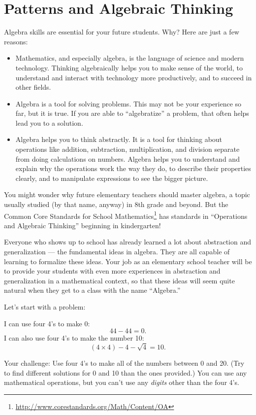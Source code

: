 
\chapter{Patterns and Algebraic Thinking}


Algebra skills are essential for your future students.  Why?  Here are just a few reasons:
\begin{itemize}
\item
Mathematics, and especially algebra, is the language of  science and modern technology.  Thinking algebraically helps you to make sense of the world, to understand and interact with technology  more productively, and to succeed in other fields.

\item
Algebra is a tool for solving problems.  This may not be your experience so far, but it is true.  If you are able to ``algebratize'' a problem, that often helps lead you to a solution.

\item
Algebra helps you to think abstractly.  It is a tool for thinking about operations like addition, subtraction, multiplication, and division separate from doing calculations on numbers.  Algebra helps you to understand and explain why the operations work the way they do, to describe their properties clearly, and to manipulate expressions to see the bigger picture.

\end{itemize}


You might wonder why future elementary teachers should master algebra, a topic usually studied (by that name, anyway) in 8th grade and beyond.  But the Common Core Standards for School Mathematics\footnote{\url{http://www.corestandards.org/Math/Content/OA}} has standards in ``Operations and Algebraic Thinking'' beginning in kindergarten!

Everyone who shows up to school has already learned a lot about abstraction and generalization --- the fundamental ideas in algebra.  They are all capable of learning to formalize these ideas.  Your job as an elementary school teacher will be to provide your students with even more experiences in abstraction and generalization in a mathematical context, so that these ideas will seem quite natural when they get to a class with the name ``Algebra.''

\newpage

Let's start with a problem:
\begin{problem}\label{prob: four4s}
I can use four 4's to make 0:
\[
44 - 44 = 0.
\]
I can also use four 4's to make the number 10:
\[
(4 \times 4) - 4 - \sqrt 4 = 10.
\]

Your challenge: Use four 4's to make all of the numbers between 0 and 20.  (Try to find different solutions for 0 and 10 than the ones provided.)
You can use any mathematical operations, but you can't use any \emph{digits} other than the four 4's.
\end{problem}

